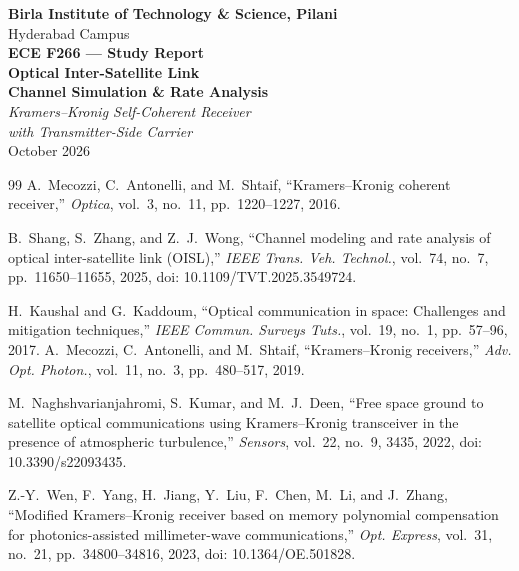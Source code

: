 \documentclass[12pt,a4paper]{report}
\begin{document}
\begin{titlepage}
\centering
\vspace*{2cm}
{\Large\bfseries Birla Institute of Technology \& Science, Pilani}\\[0.3cm]
{\large Hyderabad Campus}\\[2cm]
{\LARGE\bfseries ECE F266 --- Study Report}\\[1.5cm]
{\Huge\bfseries Optical Inter-Satellite Link\\[0.3cm]Channel Simulation \& Rate Analysis}\\[0.5cm]
{\Large\itshape Kramers--Kronig Self-Coherent Receiver\\with Transmitter-Side Carrier}\\[3cm]
{\large October 2026}\\
\vfill
\end{titlepage}

\tableofcontents
\newpage






\begin{thebibliography}{99}
 A.~Mecozzi, C.~Antonelli, and M.~Shtaif, ``Kramers--Kronig coherent receiver,'' \emph{Optica}, vol.~3, no.~11, pp.~1220--1227, 2016.

 B.~Shang, S.~Zhang, and Z.~J.~Wong, ``Channel modeling and rate analysis of optical inter-satellite link (OISL),'' \emph{IEEE Trans. Veh. Technol.}, vol.~74, no.~7, pp.~11650--11655, 2025, doi: 10.1109/TVT.2025.3549724.

 H.~Kaushal and G.~Kaddoum, ``Optical communication in space: Challenges and mitigation techniques,'' \emph{IEEE Commun. Surveys Tuts.}, vol.~19, no.~1, pp.~57--96, 2017.
 A.~Mecozzi, C.~Antonelli, and M.~Shtaif, ``Kramers--Kronig receivers,'' \emph{Adv. Opt. Photon.}, vol.~11, no.~3, pp.~480--517, 2019.

 M.~Naghshvarianjahromi, S.~Kumar, and M.~J.~Deen, ``Free space ground to satellite optical communications using Kramers--Kronig transceiver in the presence of atmospheric turbulence,'' \emph{Sensors}, vol.~22, no.~9, 3435, 2022, doi: 10.3390/s22093435.

 Z.-Y.~Wen, F.~Yang, H.~Jiang, Y.~Liu, F.~Chen, M.~Li, and J.~Zhang, ``Modified Kramers--Kronig receiver based on memory polynomial compensation for photonics-assisted millimeter-wave communications,'' \emph{Opt. Express}, vol.~31, no.~21, pp.~34800--34816, 2023, doi: 10.1364/OE.501828.
\end{thebibliography}
\end{document}
